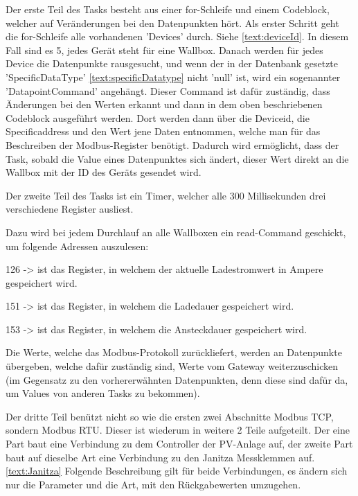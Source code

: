 Der erste Teil des Tasks besteht aus einer for-Schleife und einem Codeblock, welcher auf Veränderungen bei den Datenpunkten hört. Als erster Schritt geht die for-Schleife alle vorhandenen 'Devices' durch. Siehe \ref{text:deviceId}. In diesem Fall sind es 5, jedes Gerät steht für eine Wallbox. Danach werden für jedes Device die Datenpunkte rausgesucht, und wenn der in der Datenbank gesetzte 'SpecificDataType' \ref{text:specificDatatype} nicht 'null' ist, wird ein sogenannter 'DatapointCommand' angehängt. Dieser Command ist dafür zuständig, dass Änderungen bei den Werten erkannt und dann in dem oben beschriebenen Codeblock ausgeführt werden. Dort werden dann über die Deviceid, die Specificaddress und den Wert jene Daten entnommen, welche man für das Beschreiben der Modbus-Register benötigt. Dadurch wird ermöglicht, dass der Task, sobald die Value eines Datenpunktes sich ändert, dieser Wert direkt an die Wallbox mit der ID des Geräts gesendet wird.

Der zweite Teil des Tasks ist ein Timer, welcher alle 300 Millisekunden drei verschiedene Register ausliest.

Dazu wird bei jedem Durchlauf an alle Wallboxen ein read-Command geschickt, um folgende Adressen auszulesen:

\begin{compactitem}
  \item 126 -> ist das Register, in welchem der aktuelle Ladestromwert in Ampere gespeichert wird.
  \item 151 -> ist das Register, in welchem die Ladedauer gespeichert wird.
  \item 153 -> ist das Register, in welchem die Ansteckdauer gespeichert wird.
\end{compactitem}



Die Werte, welche das Modbus-Protokoll zurückliefert, werden an Datenpunkte übergeben, welche dafür zuständig sind, Werte vom Gateway weiterzuschicken (im Gegensatz zu den vorhererwähnten Datenpunkten, denn diese sind dafür da, um Values von anderen Tasks zu bekommen).

Der dritte Teil benützt nicht so wie die ersten zwei Abschnitte Modbus TCP, sondern Modbus RTU. Dieser ist wiederum in weitere 2 Teile aufgeteilt. Der eine Part baut eine Verbindung zu dem Controller der PV-Anlage auf, der zweite Part baut auf dieselbe Art eine Verbindung zu den Janitza Messklemmen auf. \ref{text:Janitza} Folgende Beschreibung gilt für beide Verbindungen, es ändern sich nur die Parameter und die Art, mit den Rückgabewerten umzugehen.

